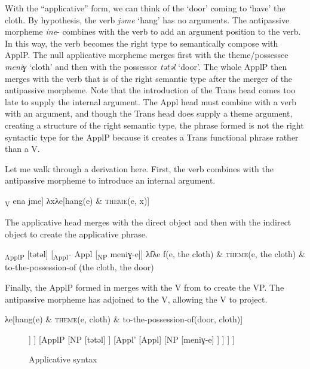 \documentclass[output=paper,colorlinks,citecolor=brown,modfonts,nonflat]{langsci/langscibook}
\begin{document}
With the ``applicative'' form, we can think of the ‘door’ coming to ‘have’ the cloth. By hypothesis, the verb \textit{jǝme} ‘hang’ has no arguments. The antipassive morpheme \textit{ine}{}- combines with the verb to add an argument position to the verb. In this way, the verb becomes the right type to semantically compose with ApplP. The null applicative morpheme merges first with the theme/possessee \textit{meniɣ} ‘cloth’ and then with the possessor \textit{tǝtǝl} ‘door’. The whole ApplP then merges with the verb that is of the right semantic type after the merger of the antipassive morpheme. Note that the introduction of the Trans head comes too late to supply the internal argument. The Appl head must combine with a verb with an argument, and though the Trans head does supply a theme argument, creating a structure of the right semantic type, the phrase formed is not the right syntactic type for the ApplP because it creates a Trans functional phrase rather than a V.

Let me walk through a derivation here. First, the verb combines with the antipassive morpheme to introduce an internal argument.

\ea%
    \label{ex:basilico:7}
    \ea {[}\textsubscript{V} ena jme{]}
    \ex λxλe[hang(e) \& \textsc{theme}(e, x)]
    \z
    \z

The applicative head merges with the direct object and then with the indirect object to create the applicative phrase.

\ea%
    \label{ex:basilico:8}
    	\ea {[}\textsubscript{ApplP} [tǝtǝl] [\textsubscript{Appl´} Appl [\textsubscript{NP} meniɣ-e]{]}
    \ex λfλe f(e, the cloth) \& \textsc{theme}(e, the cloth) \& to-the-possession-of (the cloth, the door)
    \z
    \z

Finally, the ApplP formed in  merges with the V from  to create the VP. The antipassive morpheme has adjoined to the V, allowing the V to project.

\ea%
    \label{ex:basilico:9}
    	\ea {[\textsubscript{VP} [\textsubscript{V} ena jme] [\textsubscript{ApplP} [tǝtǝl] [\textsubscript{Appl´} Appl [\textsubscript{NP} meniɣ-e]]]}
    \ex λe[hang(e) \& \textsc{theme}(e, cloth) \& to-the-possession-of(door, cloth)]
    \z
    \z

\begin{figure}
	\begin{forest}
	[VP
		[V
			[ena]
			[V
				[jme]
			]
		]
		[ApplP
			[NP
				[tǝtǝl]
			]
			[Appl'
				[Appl]
				[NP
					[meniɣ-e]
				]
			]
		]
	]
	\end{forest}
		\caption{\label{fig:basilico:9} Applicative syntax}
\end{figure}
\end{document}
